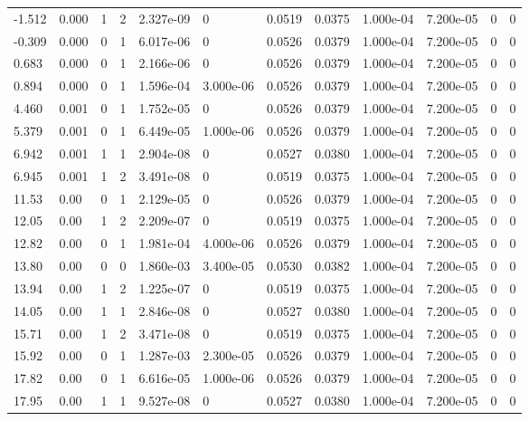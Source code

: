 \documentclass[preview]{standalone}
\begin{document}
{{\begin{tabular}{L{1.2cm}C{1.2cm} C{0.3cm}C{0.5cm} C{1.4cm}C{1.4cm} C{1.4cm}C{1.4cm} C{1.6cm}C{1.6cm} C{1.6cm}C{1.6cm}}
  -1.512  &  0.000  & 1     &  2 &  2.327e-09  & 0  &  0.0519&   0.0375& 1.000e-04 & 7.200e-05   &  0 & 0  \\ 
  -0.309  &  0.000  & 0     &  1 &  6.017e-06  & 0  &  0.0526&   0.0379& 1.000e-04 & 7.200e-05   &  0 & 0  \\ 
  0.683  &  0.000  & 0     &  1 &  2.166e-06  & 0  &  0.0526&   0.0379& 1.000e-04 & 7.200e-05   &  0 & 0  \\ 
  0.894  &  0.000  & 0     &  1 &  1.596e-04  & 3.000e-06  &  0.0526&   0.0379& 1.000e-04 & 7.200e-05   &  0 & 0  \\ 
  4.460  &  0.001  & 0     &  1 &  1.752e-05  & 0  &  0.0526&   0.0379& 1.000e-04 & 7.200e-05   &  0 & 0  \\ 
  5.379  &  0.001  & 0     &  1 &  6.449e-05  & 1.000e-06  &  0.0526&   0.0379& 1.000e-04 & 7.200e-05   &  0 & 0  \\ 
  6.942  &  0.001  & 1     &  1 &  2.904e-08  & 0  &  0.0527&   0.0380& 1.000e-04 & 7.200e-05   &  0 & 0  \\ 
  6.945  &  0.001  & 1     &  2 &  3.491e-08  & 0  &  0.0519&   0.0375& 1.000e-04 & 7.200e-05   &  0 & 0  \\ 
  11.53  &  0.00  & 0     &  1 &  2.129e-05  & 0  &  0.0526&   0.0379& 1.000e-04 & 7.200e-05   &  0 & 0  \\ 
  12.05  &  0.00  & 1     &  2 &  2.209e-07  & 0  &  0.0519&   0.0375& 1.000e-04 & 7.200e-05   &  0 & 0  \\ 
  12.82  &  0.00  & 0     &  1 &  1.981e-04  & 4.000e-06  &  0.0526&   0.0379& 1.000e-04 & 7.200e-05   &  0 & 0  \\ 
  13.80  &  0.00  & 0     &  0 &  1.860e-03  & 3.400e-05  &  0.0530&   0.0382& 1.000e-04 & 7.200e-05   &  0 & 0  \\ 
  13.94  &  0.00  & 1     &  2 &  1.225e-07  & 0  &  0.0519&   0.0375& 1.000e-04 & 7.200e-05   &  0 & 0  \\ 
  14.05  &  0.00  & 1     &  1 &  2.846e-08  & 0  &  0.0527&   0.0380& 1.000e-04 & 7.200e-05   &  0 & 0  \\ 
  15.71  &  0.00  & 1     &  2 &  3.471e-08  & 0  &  0.0519&   0.0375& 1.000e-04 & 7.200e-05   &  0 & 0  \\ 
  15.92  &  0.00  & 0     &  1 &  1.287e-03  & 2.300e-05  &  0.0526&   0.0379& 1.000e-04 & 7.200e-05   &  0 & 0  \\ 
  17.82  &  0.00  & 0     &  1 &  6.616e-05  & 1.000e-06  &  0.0526&   0.0379& 1.000e-04 & 7.200e-05   &  0 & 0  \\ 
  17.95  &  0.00  & 1     &  1 &  9.527e-08  & 0  &  0.0527&   0.0380& 1.000e-04 & 7.200e-05   &  0 & 0  \\ 

\end{tabular}}}
\end{document}
